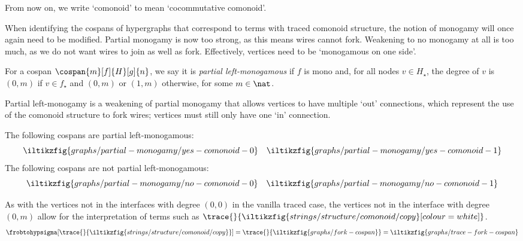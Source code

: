 

From now on, we write `comonoid' to mean `cocommutative comonoid'.

When identifying the cospans of hypergraphs that correspond to terms with traced
comonoid structure, the notion of monogamy will once again need to be modified.
Partial monogamy is now too strong, as this means wires cannot fork.
Weakening to no monogamy at all is too much, as we do not want wires to join as
well as fork.
Effectively, vertices need to be `monogamous on one side'.

\begin{definition}
    For a cospan \(\cospan{m}[f]{H}[g]{n}\), we say it is
    \emph{partial left-monogamous} if \(f\) is mono and, for all nodes
    \(v \in H_\star\), the degree of \(v\) is \((0,m)\) if \(v \in f_\star\) and
    \((0,m)\) or \((1,m)\) otherwise, for some \(m \in \nat\).
\end{definition}

Partial left-monogamy is a weakening of partial monogamy that allows vertices
to have multiple `out' connections, which represent the use of the comonoid
structure to fork wires; vertices must still only have one `in' connection.

\begin{example}\label{ex:partial-left-monogamous}
    The following cospans are partial left-monogamous:
    \[
        \iltikzfig{graphs/partial-monogamy/yes-comonoid-0}
        \quad
        \iltikzfig{graphs/partial-monogamy/yes-comonoid-1}
    \]
    The following cospans are not partial left-monogamous:
    \[
        \iltikzfig{graphs/partial-monogamy/no-comonoid-0}
        \quad
        \iltikzfig{graphs/partial-monogamy/no-comonoid-1}
    \]
\end{example}

\begin{remark}
    As with the vertices not in the interfaces with degree \((0, 0)\) in the
    vanilla traced case, the vertices not in the interface with degree
    \((0, m)\) allow for the interpretation of terms such as \(
    \trace{}{\iltikzfig{strings/structure/comonoid/copy}[colour=white]}
    \).
    \begin{gather*}
        \frobtohypsigma[\trace{}{\iltikzfig{strings/structure/comonoid/copy}}]
        =
        \trace{}{\iltikzfig{graphs/fork-cospan}}
        =
        \iltikzfig{graphs/trace-fork-cospan}
    \end{gather*}
\end{remark}

